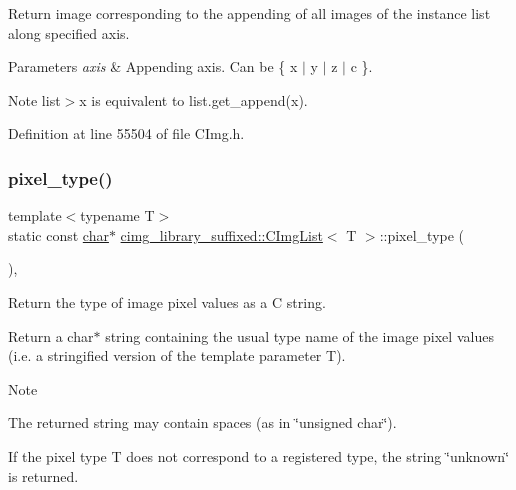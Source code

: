 Return image corresponding to the appending of all images of the instance list along specified axis. 


\begin{DoxyParams}{Parameters}
{\em axis} & Appending axis. Can be {\ttfamily \{ \textquotesingle{}x\textquotesingle{} $\vert$ \textquotesingle{}y\textquotesingle{} $\vert$ \textquotesingle{}z\textquotesingle{} $\vert$ \textquotesingle{}c\textquotesingle{} \}}. \\
\hline
\end{DoxyParams}
\begin{DoxyNote}{Note}
{\ttfamily list$>$\textquotesingle{}x\textquotesingle{}} is equivalent to {\ttfamily list.\+get\+\_\+append(\textquotesingle{}x\textquotesingle{})}. 
\end{DoxyNote}


Definition at line 55504 of file C\+Img.\+h.

\mbox{\label{structcimg__library__suffixed_1_1CImgList_a55a11e1b7827dac9e38f29e1c4cfb3ec}} 
\subsubsection{\texorpdfstring{pixel\+\_\+type()}{pixel\_type()}}
{\footnotesize\ttfamily template$<$typename T$>$ \\
static const \hyperlink{classchar}{char}$\ast$ \hyperlink{structcimg__library__suffixed_1_1CImgList}{cimg\+\_\+library\+\_\+suffixed\+::\+C\+Img\+List}$<$ T $>$\+::pixel\+\_\+type (\begin{DoxyParamCaption}{ }\end{DoxyParamCaption})\hspace{0.3cm}{\ttfamily [inline]}, {\ttfamily [static]}}



Return the type of image pixel values as a C string. 

Return a {\ttfamily char$\ast$} string containing the usual type name of the image pixel values (i.\+e. a stringified version of the template parameter {\ttfamily T}). \begin{DoxyNote}{Note}

\begin{DoxyItemize}
\item The returned string may contain spaces (as in {\ttfamily \char`\"{}unsigned char\char`\"{}}).
\item If the pixel type {\ttfamily T} does not correspond to a registered type, the string {\ttfamily \char`\"{}unknown\char`\"{}} is returned. 
\end{DoxyItemize}
\end{DoxyNote}


